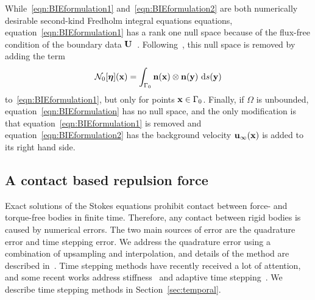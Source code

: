 \documentclass[preprint, 10pt]{elsarticle}
\begin{document}
While~\eqref{eqn:BIEformulation1} and~\eqref{eqn:BIEformulation2} are
both numerically desirable second-kind Fredholm integral equations
equations, equation~\eqref{eqn:BIEformulation1} has a rank one null
space because of the flux-free condition of the boundary data
${\mathbf{U}}$~\cite{Ladyzhenskaya1963}.  Following~\cite{Power1993}, this null
space is removed by adding the term 
\begin{align}
\label{eqn:N0_modification} 
  \mathcal{N}_0[{\boldsymbol\eta}]({\mathbf{x}}) = \int_{\Gamma_0} 
    {\mathbf{n}}({\mathbf{x}})\otimes{\mathbf{n}}({\mathbf{y}})~\text{d}s({\mathbf{y}})
\end{align}
to~\eqref{eqn:BIEformulation1}, but only for points ${\mathbf{x}} \in \Gamma_0$.
Finally, if $\Omega$ is unbounded, equation~\eqref{eqn:BIEformulation}
has no null space, and the only modification is that
equation~\eqref{eqn:BIEformulation1} is removed and
equation~\eqref{eqn:BIEformulation2} has the background velocity
${\mathbf{u}}_\infty({\mathbf{x}})$ is added to its right hand side.

\subsection{A contact based repulsion force}
\label{sec:repulsion}
Exact solutions of the Stokes equations prohibit contact between force-
and torque-free bodies in finite time.  Therefore, any contact between
rigid bodies is caused by numerical errors.  The two main sources of
error are the quadrature error and time stepping error.  We address the
quadrature error using a combination of upsampling and interpolation,
and details of the method are described in~\cite{Quaife2014}.  Time
stepping methods have recently received a lot of attention, and some
recent works address stiffness~\cite{Quaife2014} and adaptive time
stepping~\cite{Kropinski1999, Quaife2015, Sorgentone2018}.  We describe
time stepping methods in Section~\ref{sec:temporal}.

\end{document}

